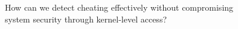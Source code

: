 How can we detect cheating effectively without compromising\\
system security through kernel-level access?